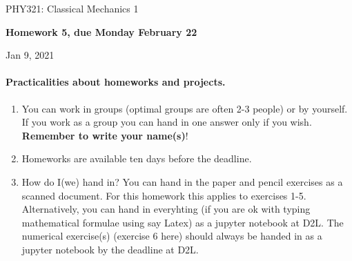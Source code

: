 \documentclass[%
oneside,                 %
final,                   %
10pt]{article}
\begin{document}

\newcommand{\exercisesection}[1]{\subsection*{#1}}






\thispagestyle{empty}

\begin{center}
{\LARGE\bf
\begin{spacing}{1.25}
PHY321: Classical Mechanics 1
\end{spacing}
}
\end{center}


\begin{center}
{\bf Homework 5, due Monday  February 22${}^{}$} \\ [0mm]
\end{center}

\begin{center}
\end{center}
    

\begin{center}
Jan 9, 2021
\end{center}

\vspace{1cm}


\paragraph{Practicalities about  homeworks and projects.}
\begin{enumerate}
\item You can work in groups (optimal groups are often 2-3 people) or by yourself. If you work as a group you can hand in one answer only if you wish. \textbf{Remember to write your name(s)}!

\item Homeworks are available ten days before the deadline.

\item How do I(we)  hand in?  You can hand in the paper and pencil exercises as a scanned document. For this homework this applies to exercises 1-5. Alternatively, you can hand in everyhting (if you are ok with typing mathematical formulae using say Latex) as a jupyter notebook at D2L. The numerical exercise(s) (exercise 6 here) should always be handed in as a jupyter notebook by the deadline at D2L. 
\end{enumerate}
\end{document}
